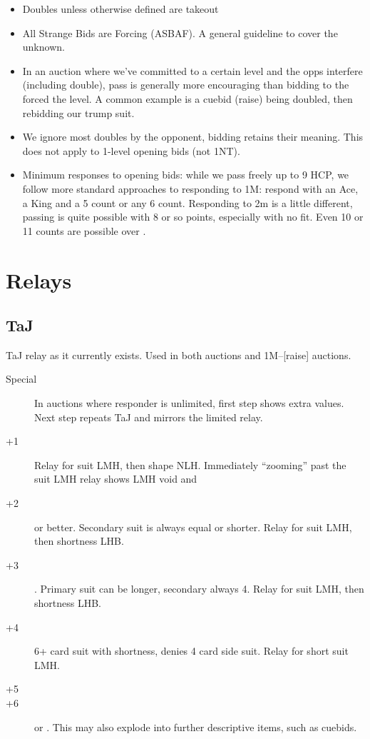 \documentclass[tom-ari]{subfile}
\begin{document}
\begin{itemize}
	\item Doubles unless otherwise defined are takeout
	\item All Strange Bids are Forcing (ASBAF).  A general guideline to cover the unknown.
	\item In an auction where we've committed to a certain level and the opps interfere (including double), pass is generally more encouraging than bidding to the forced the level.  A common example is a cuebid (raise) being doubled, then rebidding our trump suit.
	\item We ignore most doubles by the opponent, bidding retains their meaning.  This does not apply to 1-level opening bids (not 1NT).
	\item Minimum responses to opening bids: while we pass  freely up to 9 HCP, we follow more standard approaches to responding to 1M: respond with an Ace, a King and a 5 count or any 6 count.  Responding to 2m is a little different, passing is quite possible with 8 or so points, especially with no fit.  Even 10 or 11 counts are possible over .
\end{itemize}	

\section{Relays}

\subsection{TaJ}
TaJ relay as it currently exists.  Used in both  auctions and 1M--[raise] auctions.

\begin{description}
	\item[Special] In auctions where responder is unlimited, first step shows extra values.  Next step repeats TaJ and mirrors the limited relay.
	\item[+1]  Relay for \second suit LMH, then shape NLH.  Immediately ``zooming'' past the \second suit LMH relay shows LMH void and 
	\item[+2]  or better.  Secondary suit is always equal or shorter.  Relay for \second suit LMH, then shortness LHB.
	\item[+3] .  Primary suit can be longer, secondary always 4.  Relay for \second suit LMH, then shortness LHB.
	\item[+4] 6+ card suit with shortness, denies 4 card side suit.  Relay for short suit LMH.
	\item[+5] 
	\item[+6]  or .  This may also explode into further descriptive items, such as cuebids.   
\end{description}
\end{document}
